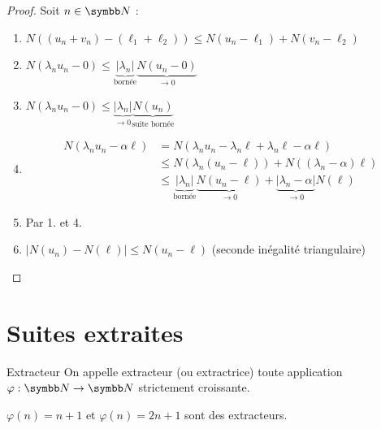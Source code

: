 

\begin{proof}
    Soit $n \in \N$ :
    \begin{enumerate}
        \item $N((u_n + v_n) - (\ell_1 + \ell_2)) \leqslant N(u_n - \ell_1) + N(v_n - \ell_2)$
        \item $N(\lambda_n u_n- 0) \leqslant \underbrace{|\lambda_n|}_{\text{bornée}} \underbrace{N(u_n - 0)}_{\rightarrow 0}$
        \item $N(\lambda_n u_n - 0) \leqslant \underbrace{|\lambda_n|}_{\rightarrow 0} \underbrace{N(u_n)}_{\text{suite bornée}}$
        \item 
        \begin{align*}
            N(\lambda_n u_n - \alpha \ell) & = N(\lambda_n u_n - \lambda_n \ell + \lambda_n \ell - \alpha \ell) \\
            & \leqslant N(\lambda_n (u_n - \ell)) + N((\lambda_n - \alpha) \ell) \\
            & \leqslant \underbrace{|\lambda_n|}_{\text{bornée}} \underbrace{N(u_n - \ell)}_{\rightarrow 0} + \underbrace{|\lambda_n - \alpha|}_{\rightarrow 0} N(\ell) 
        \end{align*}
        \item Par 1. et 4.
        \item $|N(u_n) - N(\ell)| \leqslant N(u_n - \ell)$ (seconde inégalité triangulaire)
    \end{enumerate}
\end{proof}

\section{Suites extraites}

\begin{definition}{Extracteur}{}
    On appelle extracteur (ou extractrice) toute application $\varphi : \N \to \N$ strictement croissante.
\end{definition}

\begin{exemple}
    $\varphi (n) = n +1$ et $\varphi (n) = 2n + 1$ sont des extracteurs.    
\end{exemple}


